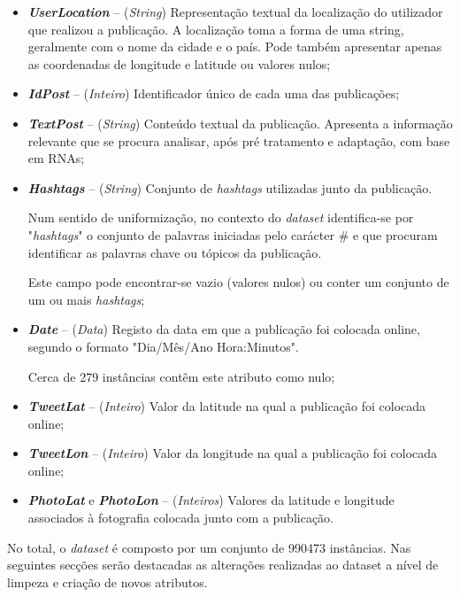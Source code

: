 \begin{itemize}
    \item \textbf{\textit{UserLocation}} – (\textit{String}) Representação textual da localização do utilizador que realizou a publicação. 
    A localização toma a forma de uma string, geralmente com o nome da cidade e o país. Pode também apresentar apenas as coordenadas de longitude e latitude ou valores nulos;
    
    \item \textbf{\textit{IdPost}} – (\textit{Inteiro}) Identificador único de cada uma das publicações;
    
    \item \textbf{\textit{TextPost}} – (\textit{String}) Conteúdo textual da publicação. 
    Apresenta a informação relevante que se procura analisar, após pré tratamento e adaptação, com base em RNAs;
    
    \item \textbf{\textit{Hashtags}} – (\textit{String}) Conjunto de \textit{hashtags} utilizadas junto da publicação. 
    
    Num sentido de uniformização, no contexto do \textit{dataset} identifica-se por "\textit{hashtags}" o conjunto de palavras iniciadas pelo carácter $\#$ e que procuram identificar as palavras chave ou tópicos da publicação. 
    
    Este campo pode encontrar-se vazio (valores nulos) ou conter um conjunto de um ou mais \textit{hashtags};
    
    \item \textbf{\textit{Date}} – (\textit{Data}) Registo da data em que a publicação foi colocada online, segundo o formato "Dia/Mês/Ano Hora:Minutos". 
    
    Cerca de 279 instâncias contêm este atributo como nulo;
    
    \item \textbf{\textit{TweetLat}} – (\textit{Inteiro}) Valor da latitude na qual a publicação foi colocada online;
    \item \textbf{\textit{TweetLon}} – (\textit{Inteiro}) Valor da longitude na qual a publicação foi colocada online;
    
    \item \textbf{\textit{PhotoLat}} e \textbf{\textit{PhotoLon}} – (\textit{Inteiros}) Valores da latitude e longitude associados à fotografia colocada junto com a publicação.
\end{itemize}

No total, o \textit{\textit{dataset}} é composto por um conjunto de 990473 instâncias. Nas seguintes secções serão destacadas as alterações realizadas ao dataset a nível de limpeza e criação de novos atributos. 


